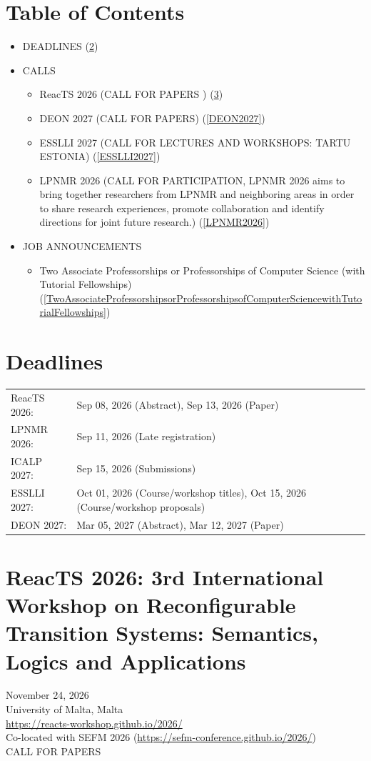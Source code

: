 \documentclass[prodmode,acmtecs]{acmsmall} %
\begin{document}
\section{Table of Contents}\begin{itemize}\item DEADLINES (\cref{deadlines}) 
 
\item CALLS 
 
\begin{itemize}\item ReacTS 2026 (CALL FOR PAPERS ) (\cref{ReacTS2026})
\item DEON 2027 (CALL FOR PAPERS) (\cref{DEON2027})
\item ESSLLI 2027 (CALL FOR LECTURES AND WORKSHOPS: TARTU ESTONIA) (\cref{ESSLLI2027})
\item LPNMR 2026 (CALL FOR PARTICIPATION, LPNMR 2026 aims to bring together researchers from LPNMR and neighboring areas in order to share research experiences, promote collaboration and identify directions for joint future research.) (\cref{LPNMR2026})
\end{itemize} 
\item JOB ANNOUNCEMENTS 
 
\begin{itemize}\item Two Associate Professorships or Professorships of Computer Science (with Tutorial Fellowships) (\cref{TwoAssociateProfessorshipsorProfessorshipsofComputerSciencewithTutorialFellowships})
\end{itemize} 
\end{itemize}\section{Deadlines}\label{deadlines}\begin{tabulary}{\linewidth}{LL}ReacTS 2026:  & Sep 08, 2026 (Abstract), Sep 13, 2026 (Paper) \\
LPNMR 2026:  & Sep 11, 2026 (Late registration) \\
ICALP 2027:  & Sep 15, 2026 (Submissions) \\
ESSLLI 2027:  & Oct 01, 2026 (Course/workshop titles), Oct 15, 2026 (Course/workshop proposals) \\
DEON 2027:  & Mar 05, 2027 (Abstract), Mar 12, 2027 (Paper) \\
\end{tabulary}
\section{ReacTS 2026: 3rd International Workshop on Reconfigurable Transition Systems: Semantics, Logics and Applications}\label{ReacTS2026}  November 24, 2026\\ 
  University of Malta, Malta\\ 
  \href{https://reacts-workshop.github.io/2026/}{https://reacts-workshop.github.io/2026/}\\ 
  Co-located with SEFM 2026 (\href{https://sefm-conference.github.io/2026/}{https://sefm-conference.github.io/2026/})\\ 
CALL FOR PAPERS  
\end{document}
